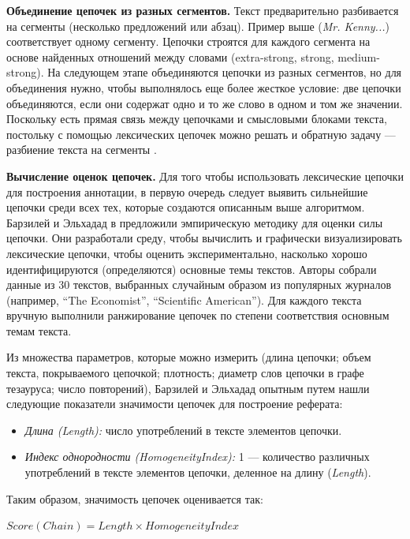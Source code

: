 \documentclass{article}
\begin{document}
\begin{articletext}
\efullwidth

\textbf{Объединение цепочек из разных сегментов.} Текст предварительно разбивается на сегменты (несколько предложений или абзац). Пример выше (\textit{Mr. Kenny...}) соответствует одному сегменту. Цепочки строятся для каждого сегмента на основе найденных отношений между словами (extra-strong, strong, medium-strong). На следующем этапе объединяются цепочки из разных сегментов, но для объединения нужно, чтобы выполнялось еще более жесткое условие: две цепочки объединяются, если они содержат одно и то же слово в одном и том же значении. Поскольку есть прямая связь между цепочками и смысловыми блоками текста, постольку с помощью лексических цепочек можно решать и обратную задачу --- разбиение текста на сегменты \cite{Barzilay Elhadad 1997}.

\textbf{Вычисление оценок цепочек.} Для того чтобы использовать лексические цепочки для построения аннотации, в первую очередь следует выявить сильнейшие цепочки среди всех тех, которые создаются описанным выше алгоритмом. Барзилей и Эльхадад в \cite{Barzilay Elhadad 1997}  предложили  эмпирическую методику для оценки силы цепочки. Они разработали среду, чтобы вычислить и графически визуализировать лексические цепочки, чтобы оценить экспериментально, насколько хорошо идентифицируются (определяются) основные темы текстов. Авторы собрали данные из 30 текстов, выбранных случайным образом из популярных журналов (например, “The Economist”, “Scientific American”). Для каждого текста вручную выполнили ранжирование цепочек по степени соответствия основным темам текста. 

Из множества параметров, которые можно измерить (длина цепочки; объем текста, покрываемого цепочкой; плотность; диаметр слов цепочки в графе тезауруса; число повторений), Барзилей и Эльхадад \cite{Barzilay Elhadad 1997} опытным путем нашли следующие показатели значимости цепочек для построение реферата:

\begin{itemize}
\item \textit{Длина (Length):} число употреблений в тексте элементов цепочки.
\item \textit{Индекс однородности (HomogeneityIndex):} 1 --- количество различных употреблений в тексте элементов цепочки, деленное на длину (\textit{Length}).
\end{itemize}

Таким образом, значимость цепочек оценивается так:

\begin{center}
$Score(Chain) = Length \times HomogeneityIndex$
\end{center}


\end{articletext}
\end{document}
